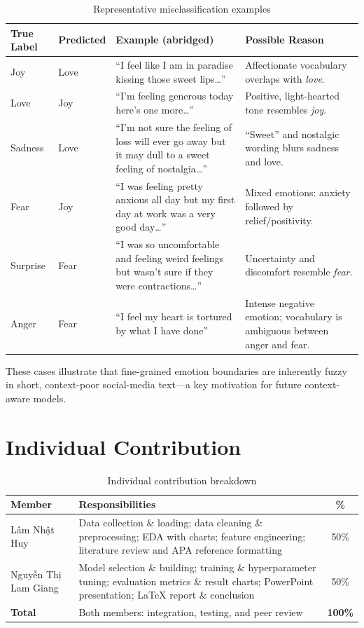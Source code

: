 \documentclass[12pt]{article}
\begin{document}
\begin{table}[H]
\centering
\caption{Representative misclassification examples}
\label{tab:errors}
\small
\begin{tabularx}{\textwidth}{@{}p{1.6cm}p{1.7cm}>{\raggedright\arraybackslash}p{5.0cm}>{\raggedright\arraybackslash}X@{}}
\toprule
\textbf{True Label} & \textbf{Predicted} & \textbf{Example (abridged)} & \textbf{Possible Reason} \\
\midrule
Joy & Love & ``I feel like I am in paradise kissing those sweet lips\ldots'' & Affectionate vocabulary overlaps with \textit{love}. \\
Love & Joy & ``I'm feeling generous today here's one more\ldots'' & Positive, light-hearted tone resembles \textit{joy}. \\
Sadness & Love & ``I'm not sure the feeling of loss will ever go away but it may dull to a sweet feeling of nostalgia\ldots'' & ``Sweet'' and nostalgic wording blurs sadness and love. \\
Fear & Joy & ``I was feeling pretty anxious all day but my first day at work was a very good day\ldots'' & Mixed emotions: anxiety followed by relief/positivity. \\
Surprise & Fear & ``I was so uncomfortable and feeling weird feelings but wasn't sure if they were contractions\ldots'' & Uncertainty and discomfort resemble \textit{fear}. \\
Anger & Fear & ``I feel my heart is tortured by what I have done'' & Intense negative emotion; vocabulary is ambiguous between anger and fear. \\
\bottomrule
\end{tabularx}
\end{table}

These cases illustrate that fine-grained emotion boundaries are inherently fuzzy in short, context-poor social-media text---a key motivation for future context-aware models.

\section{Individual Contribution}

\begin{table}[H]
\centering
\caption{Individual contribution breakdown}
\label{tab:contrib}
\small
\begin{tabularx}{\textwidth}{@{}l>{\raggedright\arraybackslash}Xc@{}}
\toprule
\textbf{Member} & \textbf{Responsibilities} & \textbf{\%} \\
\midrule
Lâm Nhật Huy &
Data collection \& loading; data cleaning \& preprocessing; EDA with charts; feature engineering; literature review and APA reference formatting &
50\% \\
Nguyễn Thị Lam Giang &
Model selection \& building; training \& hyperparameter tuning; evaluation metrics \& result charts; PowerPoint presentation; LaTeX report \& conclusion &
50\% \\
\midrule
\textbf{Total} &
Both members: integration, testing, and peer review &
\textbf{100\%} \\
\bottomrule
\end{tabularx}
\end{table}
\end{document}
